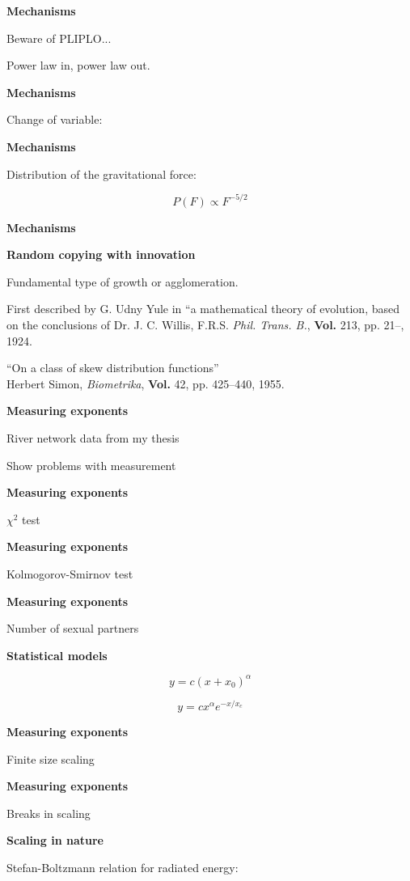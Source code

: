   \textbf{Mechanisms}

Beware of PLIPLO...

Power law in, power law out.


  \textbf{Mechanisms}

Change of variable:


  \textbf{Mechanisms}

Distribution of the gravitational force:

$$ P(F) \propto F^{-5/2} $$



  \textbf{Mechanisms}

\textbf{Random copying with innovation}

Fundamental type of growth or agglomeration.

First described by G. Udny Yule in 
``a mathematical theory of evolution, based on the 
conclusions of Dr. J. C. Willis, F.R.S.
\textit{Phil. Trans. B.}, \textbf{Vol.} 213, pp. 21--, 1924.

``On a class of skew distribution functions''\\
Herbert Simon, \textit{Biometrika}, \textbf{Vol.} 42, pp. 425--440, 1955.


  \textbf{Measuring exponents}

River network data from my thesis

Show problems with measurement




  \textbf{Measuring exponents}

$\chi^2$ test


  \textbf{Measuring exponents}

Kolmogorov-Smirnov test



  \textbf{Measuring exponents}

Number of sexual partners



  \textbf{Statistical models}

$$y = c (x + x_0)^\alpha$$

$$y = c x^\alpha e^{-x/x_c}$$


  \textbf{Measuring exponents}

Finite size scaling


  \textbf{Measuring exponents}

Breaks in scaling



  \textbf{Scaling in nature}

Stefan-Boltzmann relation for radiated energy:

